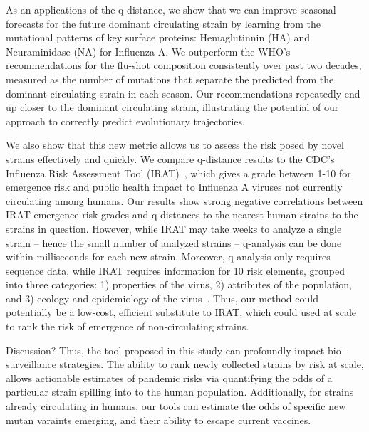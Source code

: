 \documentclass[onecolumn, compsoc,10pt]{IEEEtran}
\begin{document}
As an applications of the q-distance, we show that we can improve seasonal forecasts for the future dominant circulating strain by learning from the mutational patterns of key surface proteins: Hemaglutinnin (HA) and Neuraminidase (NA) for Influenza A. We outperform the WHO's recommendations for the flu-shot composition consistently over past two decades, measured as the number of mutations that separate the predicted from the dominant circulating strain in each season. Our recommendations repeatedly end up closer to the dominant circulating strain, illustrating the potential of our approach to correctly predict evolutionary trajectories. 

We also show that this new metric allows us to  assess the risk posed by novel strains  effectively and quickly. We compare q-distance results to the CDC's Influenza Risk Assessment Tool (IRAT)~\cite{Influenz24:online}, which gives a grade between 1-10 for emergence risk and public health impact to Influenza A viruses not currently circulating among humans. Our results show strong negative correlations between IRAT emergence risk grades and q-distances to the nearest human strains to the strains in question. However, while IRAT may take weeks to analyze a single strain -- hence the small number of analyzed strains -- q-analysis can be done within milliseconds for each new strain. Moreover, q-analysis only requires sequence data, while IRAT requires information for 10 risk elements, grouped into three categories: 1) properties of the virus, 2) attributes of the population, and 3) ecology and epidemiology of the virus~\cite{Influenz24:online}. Thus, our method could potentially be a low-cost, efficient substitute to IRAT, which could used at scale to rank the risk of emergence of non-circulating strains.

{\color{Red1} Discussion? 
Thus, the tool proposed in this study  can  profoundly impact  bio-surveillance strategies. The ability to rank newly collected strains by risk at scale, allows actionable estimates of  pandemic risks via  quantifying the odds of a particular strain spilling into to the human population. Additionally,  for strains already circulating in humans, our tools can estimate the odds  of specific  new mutan varaints emerging, and their ability to  escape current vaccines. %
}
\end{document}

